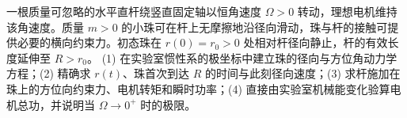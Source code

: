 一根质量可忽略的水平直杆绕竖直固定轴以恒角速度 \(\Omega>0\) 转动，理想电机维持该角速度。质量 \(m>0\) 的小珠可在杆上无摩擦地沿径向滑动，珠与杆的接触可提供必要的横向约束力。初态珠在 \(r(0)=r_0>0\) 处相对杆径向静止，杆的有效长度延伸至 \(R>r_0\)。
(1) 在实验室惯性系的极坐标中建立珠的径向与方位角动力学方程；(2) 精确求 \(r(t)\)、珠首次到达 \(R\) 的时间与此刻径向速度；(3) 求杆施加在珠上的方位向约束力、电机转矩和瞬时功率；(4) 直接由实验室机械能变化验算电机总功，并说明当 \(\Omega\to0^+\) 时的极限。
